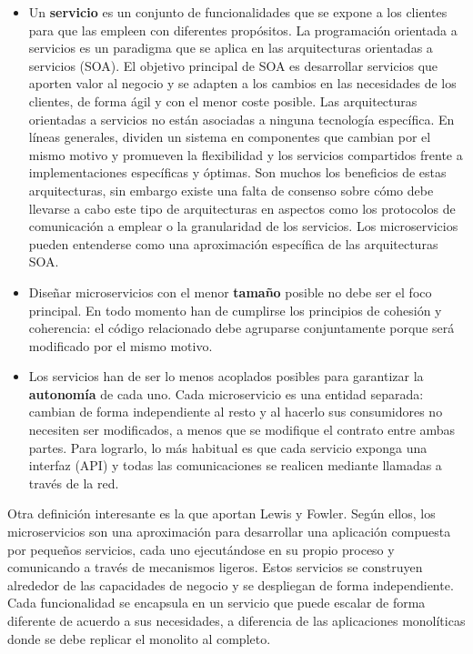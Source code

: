\documentclass[11pt,spanish,listoffigures,listoftables]{tfgetsinf}
\begin{document}
\begin{itemize}

\item Un \textbf{servicio} es un conjunto de funcionalidades que se expone a los clientes para que las empleen con diferentes propósitos. \cite{Wikipedia} La programación orientada a servicios es un paradigma que se aplica en las arquitecturas orientadas a servicios (SOA). El objetivo principal de SOA es desarrollar servicios que aporten valor al negocio y se adapten a los cambios en las necesidades de los clientes, de forma ágil y con el menor coste posible. Las arquitecturas orientadas a servicios no están asociadas a ninguna tecnología específica. En líneas generales, dividen un sistema en componentes que cambian por el mismo motivo y promueven la flexibilidad y los servicios compartidos frente a implementaciones específicas y óptimas. Son muchos los beneficios de estas arquitecturas, sin embargo existe una falta de consenso sobre cómo debe llevarse a cabo este tipo de arquitecturas en aspectos como los protocolos de comunicación a emplear o la granularidad de los servicios. \cite{Arsanjani2009a} Los microservicios pueden entenderse como una aproximación específica de las arquitecturas SOA.

\item Diseñar microservicios con el menor \textbf{tamaño} posible no debe ser el foco principal. En todo momento han de cumplirse los principios de cohesión y coherencia: el código relacionado debe agruparse conjuntamente porque será modificado por el mismo motivo.

\item  Los servicios han de ser lo menos acoplados posibles para garantizar la \textbf{autonomía} de cada uno. Cada microservicio es una entidad separada: cambian de forma independiente al resto y al hacerlo sus consumidores no necesiten ser modificados, a menos que se modifique el contrato entre ambas partes. Para lograrlo, lo más habitual es que cada servicio exponga una interfaz (API) y todas las comunicaciones se realicen mediante llamadas a través de la red.

\end{itemize}

Otra definición interesante es la que aportan Lewis y Fowler. Según ellos, los microservicios son una aproximación para desarrollar una aplicación compuesta por pequeños servicios, cada uno ejecutándose en su propio proceso y comunicando a través de mecanismos ligeros. Estos servicios se construyen alrededor de las capacidades de negocio y se despliegan de forma independiente. \cite{Lewis2014} Cada funcionalidad se encapsula en un servicio que puede escalar de forma diferente de acuerdo a sus necesidades, a diferencia de las aplicaciones monolíticas donde se debe replicar el monolito al completo.
\end{document}
